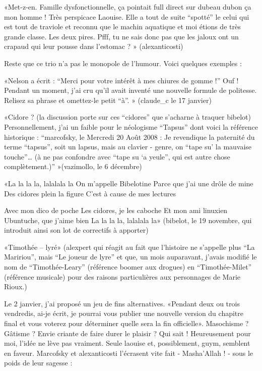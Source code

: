 \begin{Postface}
    «Met-z-en. Famille dysfonctionnelle, ça pointait full direct sur dubeau dubon ça mon homme ! Très perspicace Laouise. Elle a tout de suite “spotté” le celui qui est tout de traviole et reconnu que le machin aquatique et moi étions de très grande classe. Les deux pires. Pfff, tu ne sais donc pas que les jaloux ont un crapaud qui leur pousse dans l’estomac ? » (alexanticosti)

Reste que ce trio n’a pas le monopole de l’humour. Voici quelques exemples :

    «Nelson a écrit : “Merci pour votre intérêt à mes chiures de gomme !” Ouf ! Pendant un moment, j’ai cru qu’il avait inventé une nouvelle formule de politesse. Relisez sa phrase et omettez-le petit “à”. » (claude_c le 17 janvier)

    «Cidore ? (la discussion porte sur ces “cidores” que s’acharne à traquer bibelot) Personnellement, j’ai un faible pour le néologisme “Tapsus” dont voici la référence historique : “marcofsky, le Mercredi 20 Août 2008 : Je revendique la paternité du terme “tapsus”, soit un lapsus, mais au clavier - genre, on “tape su’ la mauvaise touche”… (à ne pas confondre avec “tape su ‘a yeule”, qui est autre chose complètement.)” »(vazimollo, le 6 décembre)

    «La la la la, lalalala la
    On m’appelle Bibelotine
    Parce que j’ai une drôle de mine
    Des cidores plein la figure
    C’est à cause de mes lectures

    Avec mon dico de poche
    Les cidores, je les caboche
    Et mon ami linuxien
    Ubuntuche, que j’aime bien
    La la la la, lalalala la» (bibelot, le 19 novembre, qui introduit ainsi son lot de correctifs à apporter)

    «Timothée – lyré» (alexpert qui réagit au fait que l’histoire ne s’appelle plus “La Maririou”, mais “Le joueur de lyre” et que, un mois auparavant, j’avais modifié le nom de “Timothée-Leary” (référence boomer aux drogues) en “Timothée-Milet” (référence musicale) pour des raisons particulières aux personnages de Marie Rioux.)

Le 2 janvier, j’ai proposé un jeu de fins alternatives. «Pendant deux ou trois vendredis, ai-je écrit, je pourrai vous publier une nouvelle version du chapitre final et vous voterez pour déterminer quelle sera la fin officielle». Masochisme ? Gâtisme ? Envie criante de faire durer le plaisir ? Qui sait ! Heureusement pour moi, l’idée ne lève pas vraiment. Seule laouise et, possiblement, guym, semblent en faveur. Marcofsky et alexanticosti l’écrasent vite fait - Masha’Allah ! - sous le poids de leur sagesse :


\end{Postface}
